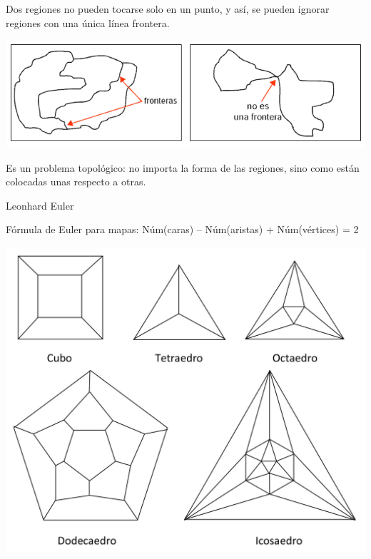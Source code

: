 \documentclass[spanish,utf8]{beamer}
\begin{document}
\begin{frame}{}
\begin{block}{}
Dos regiones no pueden tocarse solo en un punto, y así, se pueden ignorar regiones con una única línea frontera.
\end{block}
\begin{center}
\includegraphics[scale=0.3]{fronteras.png}
\end{center}

\begin{block}{}
Es un problema topológico: no importa la forma de las regiones, sino como están colocadas unas respecto a otras.
\end{block}
\end{frame}


\begin{frame}{Leonhard Euler}
\begin{block}{Fórmula de Euler para mapas:}
Núm(caras) – Núm(aristas) + Núm(vértices) = 2
\end{block}
\begin{center}
   \includegraphics[scale=0.08]{poliedros2.jpg}
\end{center}
\end{frame}
\end{document}
